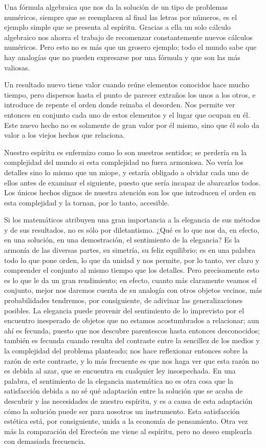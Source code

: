 \documentclass[a4paper, 12pt]{article}
\begin{document}
Una fórmula algebraica que nos da la solución de un tipo de
problemas numéricos, siempre que se reemplacen al final las letras por números, es el ejemplo simple que se presenta al espíritu. Gracias a
ella un solo cálculo algebraico nos ahorra el trabajo de recomenzar
constantemente nuevos cálculos numéricos. Pero esto no es más
que un grosero ejemplo; todo 
el mundo sabe que hay analogías que no pueden expresarse por una fórmula y que son las más valiosas.



Un resultado nuevo tiene valor cuando reúne elementos conocidos hace
mucho tiempo, pero dispersos hasta el punto de parecer extraños los unos
a los otros, e introduce de repente el orden donde reinaba el desorden. Nos
permite ver entonces en conjunto cada uno de estos elementos y el lugar que
ocupan en él. Este nuevo hecho no es solamente de gran valor por él
mismo, sino que él solo da valor a los viejos hechos que relaciona.

Nuestro espíritu es enfermizo como lo son nuestros sentidos; se perdería en la complejidad del mundo si esta complejidad no fuera armoniosa.
No vería los detalles sino lo mismo que un miope, y estaría
obligado a olvidar cada uno de ellos antes de examinar el siguiente, puesto
que sería incapaz de abarcarlos todos. Los únicos hechos dignos de
nuestra atención son los que introducen el orden en esta complejidad y
la tornan, por lo tanto, accesible.

Si los matemáticos atribuyen una gran importancia a la elegancia de sus métodos y de sus resultados, no es sólo por diletantismo. ¿Qué
es lo que nos da, en efecto, en una solución, en una demostración,
el sentimiento de la elegancia? Es la armonía de las diversas partes,
su simetría, su feliz equilibrio; es en una palabra todo lo que pone
orden, lo que da unidad y nos permite, por lo tanto, ver claro y comprender
el conjunto al mismo tiempo que los detalles. Pero precisamente esto es lo
que le da un gran rendimiento; en efecto, cuanto más claramente veamos
el conjunto, mejor nos daremos cuenta de su analogía con otros objetos
vecinos, más probabilidades tendremos, por consiguiente, de adivinar las
generalizaciones posibles. La elegancia puede provenir del sentimiento de lo
imprevisto por el encuentro inesperado de objetos que no estamos
acostumbrados a relacionar; aun ahí es fecunda, puesto que nos
descubre parentescos hasta entonces desconocidos; también es fecunda
cuando resulta del contraste entre la sencillez de los medios y la
complejidad del problema planteado; nos hace reflexionar entonces sobre la
razón de este contraste, y lo más frecuente es que nos haga ver que
esta razón no es debida al azar, que se encuentra en cualquier
 ley insospechada. En una palabra, el sentimiento de la elegancia matemática no es otra cosa que la satisfacción debida a no sé qué
adaptación entre la solución que se acaba de descubrir y las
necesidades de nuestro espíritu, y es a causa de esta adaptación cómo la solución puede ser para nosotros un instrumento. Esta
satisfacción estética está, por consiguiente, unida a la economía de pensamiento. Otra vez más la comparación del Erecteón
me viene al espíritu, pero no deseo emplearla con demasiada frecuencia.
\end{document}

